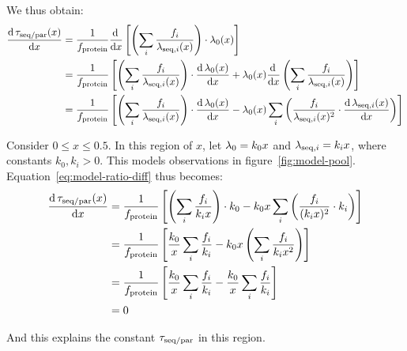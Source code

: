 We thus obtain:
\begin{equation}
  \begin{aligned}
  \frac{\mathrm{d} \, \tau_{\mathrm{seq}/\mathrm{par}}(x)}{\mathrm{d} x} &= \frac{1}{f_{\mathrm{protein}}} \frac{\mathrm{d} \, }{\mathrm{d} x} \left[ \left( \sum_i \frac{f_i}{\lambda_{\mathrm{seq},i}(x)} \right) \cdot \lambda_{0}(x) \right]\\
  &= \frac{1}{f_{\mathrm{protein}}} \left[ \left( \sum_i \frac{f_i}{\lambda_{\mathrm{seq},i}(x)} \right) \cdot \frac{\mathrm{d} \, \lambda_{0}(x)}{\mathrm{d} x} + \lambda_{0}(x) \frac{\mathrm{d} \, }{\mathrm{d} x} \left( \sum_i \frac{f_i}{\lambda_{\mathrm{seq},i}(x)} \right) \right]\\
  &= \frac{1}{f_{\mathrm{protein}}} \left[ \left( \sum_i \frac{f_i}{\lambda_{\mathrm{seq},i}(x)} \right) \cdot \frac{\mathrm{d} \, \lambda_{0}(x)}{\mathrm{d} x} - \lambda_{0}(x) \sum_{i}\left( \frac{f_{i}}{\lambda_{\mathrm{seq},i}(x)^{2}} \cdot \frac{\mathrm{d} \, \lambda_{\mathrm{seq},i}(x)}{\mathrm{d} x} \right) \right]
  \end{aligned}
  \label{eq:model-ratio-diff}
\end{equation}

Consider $0 \leq x \leq 0.5$.
In this region of $x$, let $\lambda_{0} = k_{0}x$ and $\lambda_{\mathrm{seq},i} = k_{i}x$, where constants $k_{0}, k_{i} > 0$.
This models observations in figure~\ref{fig:model-pool}.
Equation~\ref{eq:model-ratio-diff} thus becomes:
\begin{equation}
  \begin{aligned}
  \frac{\mathrm{d} \, \tau_{\mathrm{seq}/\mathrm{par}}(x)}{\mathrm{d} x} &= \frac{1}{f_{\mathrm{protein}}} \left[ \left( \sum_i \frac{f_i}{k_{i}x} \right) \cdot k_{0} - k_{0}x \sum_{i}\left( \frac{f_{i}}{(k_{i}x)^{2}} \cdot k_{i} \right) \right]\\
  &= \frac{1}{f_{\mathrm{protein}}} \left[ \frac{k_{0}}{x} \sum_i \frac{f_i}{k_{i}} - k_{0}x \left( \sum_{i} \frac{f_{i}}{k_{i}x^{2}} \right) \right]\\
  &= \frac{1}{f_{\mathrm{protein}}} \left[ \frac{k_{0}}{x} \sum_i \frac{f_i}{k_{i}} - \frac{k_{0}}{x} \sum_i \frac{f_i}{k_{i}} \right]\\
  &= 0
  \end{aligned}
  \label{eq:model-ratio-diff-smallx}
\end{equation}

And this explains the constant $\tau_{\mathrm{seq}/\mathrm{par}}$ in this region.

